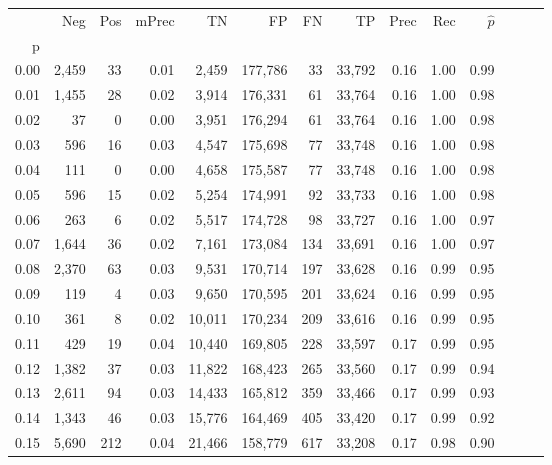 \begin{tabular}{rrrrrrrrrrrrrr}
\toprule
{} &     Neg &    Pos & mPrec &       TN &       FP &      FN &      TP &  Prec &   Rec & $\hat{p}$ \\
p    &         &        &       &          &          &         &         &       &       &           \\
\midrule
0.00 &   2,459 &     33 &  0.01 &    2,459 &  177,786 &      33 &  33,792 &  0.16 &  1.00 &      0.99 \\
0.01 &   1,455 &     28 &  0.02 &    3,914 &  176,331 &      61 &  33,764 &  0.16 &  1.00 &      0.98 \\
0.02 &      37 &      0 &  0.00 &    3,951 &  176,294 &      61 &  33,764 &  0.16 &  1.00 &      0.98 \\
0.03 &     596 &     16 &  0.03 &    4,547 &  175,698 &      77 &  33,748 &  0.16 &  1.00 &      0.98 \\
0.04 &     111 &      0 &  0.00 &    4,658 &  175,587 &      77 &  33,748 &  0.16 &  1.00 &      0.98 \\
0.05 &     596 &     15 &  0.02 &    5,254 &  174,991 &      92 &  33,733 &  0.16 &  1.00 &      0.98 \\
0.06 &     263 &      6 &  0.02 &    5,517 &  174,728 &      98 &  33,727 &  0.16 &  1.00 &      0.97 \\
0.07 &   1,644 &     36 &  0.02 &    7,161 &  173,084 &     134 &  33,691 &  0.16 &  1.00 &      0.97 \\
0.08 &   2,370 &     63 &  0.03 &    9,531 &  170,714 &     197 &  33,628 &  0.16 &  0.99 &      0.95 \\
0.09 &     119 &      4 &  0.03 &    9,650 &  170,595 &     201 &  33,624 &  0.16 &  0.99 &      0.95 \\
0.10 &     361 &      8 &  0.02 &   10,011 &  170,234 &     209 &  33,616 &  0.16 &  0.99 &      0.95 \\
0.11 &     429 &     19 &  0.04 &   10,440 &  169,805 &     228 &  33,597 &  0.17 &  0.99 &      0.95 \\
0.12 &   1,382 &     37 &  0.03 &   11,822 &  168,423 &     265 &  33,560 &  0.17 &  0.99 &      0.94 \\
0.13 &   2,611 &     94 &  0.03 &   14,433 &  165,812 &     359 &  33,466 &  0.17 &  0.99 &      0.93 \\
0.14 &   1,343 &     46 &  0.03 &   15,776 &  164,469 &     405 &  33,420 &  0.17 &  0.99 &      0.92 \\
0.15 &   5,690 &    212 &  0.04 &   21,466 &  158,779 &     617 &  33,208 &  0.17 &  0.98 &      0.90 \\

\end{tabular}
